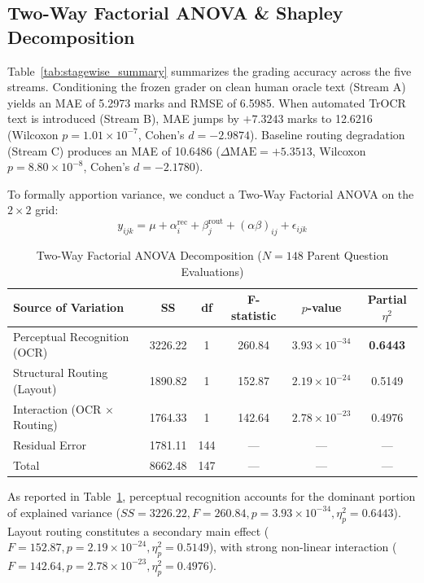 \documentclass[journal]{IEEEtran}
\begin{document}
\subsection{Two-Way Factorial ANOVA \& Shapley Decomposition}
Table~\ref{tab:stagewise_summary} summarizes the grading accuracy across the five streams. Conditioning the frozen grader on clean human oracle text (Stream A) yields an MAE of 5.2973 marks and RMSE of 6.5985. When automated TrOCR text is introduced (Stream B), MAE jumps by $+7.3243$ marks to 12.6216 (Wilcoxon $p = 1.01 \times 10^{-7}$, Cohen's $d = -2.9874$). Baseline routing degradation (Stream C) produces an MAE of 10.6486 ($\Delta\text{MAE} = +5.3513$, Wilcoxon $p = 8.80 \times 10^{-8}$, Cohen's $d = -2.1780$).

To formally apportion variance, we conduct a Two-Way Factorial ANOVA on the $2 \times 2$ grid:
\begin{equation}
y_{ijk} = \mu + \alpha_i^{\text{rec}} + \beta_j^{\text{rout}} + (\alpha\beta)_{ij} + \epsilon_{ijk}
\end{equation}

\begin{table}[t]
\centering
\caption{Two-Way Factorial ANOVA Decomposition ($N = 148$ Parent Question Evaluations)}
\label{tab:anova}
\begin{tabular}{lccccc}
\toprule
\textbf{Source of Variation} & \textbf{SS} & \textbf{df} & \textbf{F-statistic} & \textbf{$p$-value} & \textbf{Partial $\eta^2$} \\
\midrule
Perceptual Recognition (OCR) & 3226.22 & 1 & 260.84 & $3.93 \times 10^{-34}$ & \textbf{0.6443} \\
Structural Routing (Layout) & 1890.82 & 1 & 152.87 & $2.19 \times 10^{-24}$ & 0.5149 \\
Interaction (OCR $\times$ Routing) & 1764.33 & 1 & 142.64 & $2.78 \times 10^{-23}$ & 0.4976 \\
Residual Error & 1781.11 & 144 & --- & --- & --- \\
\midrule
Total & 8662.48 & 147 & --- & --- & --- \\
\bottomrule
\end{tabular}
\end{table}

As reported in Table~\ref{tab:anova}, perceptual recognition accounts for the dominant portion of explained variance ($SS = 3226.22, F = 260.84, p = 3.93 \times 10^{-34}, \eta_p^2 = 0.6443$). Layout routing constitutes a secondary main effect ($F = 152.87, p = 2.19 \times 10^{-24}, \eta_p^2 = 0.5149$), with strong non-linear interaction ($F = 142.64, p = 2.78 \times 10^{-23}, \eta_p^2 = 0.4976$).
\end{document}
